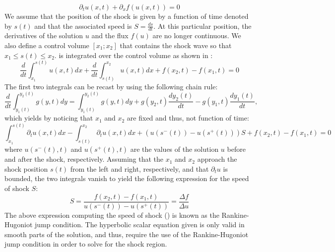 %
\begin{equation}\label{eq:rh_sct1b}
\partial_t u(x,t) + \partial_x f(u(x,t)) = 0
\end{equation}
%
We assume that the position of the shock is given by a function of time denoted by $s(t)$ and that the associated speed is $S = \frac{ds}{dt}$. At this particular position, the derivatives of the solution $u$ and the flux $f(u)$ are no longer continuous. We also define a control volume $\left[ x_1; x_2 \right]$ that contains the shock wave so that $x_1 \leq s(t) \leq x_2$.  is integrated over the control volume as shown in :
%
\begin{equation}\label{eq:rh2_sct1b}
\frac{d}{dt} \int_{x_1}^{s(t)} u(x,t) dx + \frac{d}{dt} \int_{s(t)}^{x_2} u(x,t) dx + f(x_2,t) - f(x_1,t) = 0
\end{equation}
% 
The first two integrals can be recast by using the following chain rule:
%
\begin{equation}\label{eq:rh3_sct1b}
\frac{d}{dt} \int_{y_1(t)}^{y_2(t)} g(y,t) dy =  \int_{y_1(t)}^{y_2(t)} g(y,t) dy + g(y_2,t) \frac{d y_2(t)}{dt} - g(y_1,t) \frac{d y_1(t)}{dt},
\end{equation}
% 
which yields by noticing that $x_1$ and $x_2$ are fixed and thus, not function of time:
%
\begin{equation}\label{eq:rh4_sct1b}
\int_{x_1}^{s(t)} \partial_t u(x,t) dx - \int_{s(t)}^{x_2} \partial_t u(x,t) dx + \left( u(s^-(t)) - u(s^+(t)) \right) S + f(x_2,t) - f(x_1,t) = 0
\end{equation}
%
where $u(s^-(t),t)$ and $u(s^+(t),t)$ are the values of the solution $u$ before and after the shock, respectively. Assuming that the $x_1$ and $x_2$ approach the shock position $s(t)$ from the left and right, respectively, and that $\partial_t u$ is bounded, the two integrals vanish to yield the following expression for the speed of shock $S$:
%
\begin{equation}\label{eq:rh5_sct1b}
S = \frac{f(x_2,t) - f(x_1,t)}{u(s^-(t)) - u(s^+(t))} = \frac{\Delta f}{\Delta u}
\end{equation}
%
The above expression computing the speed of shock () is known as the Rankine-Hugoniot jump condition. The hyperbolic scalar equation given  is only valid in smooth parts of the solution, and thus, require the use of the Rankine-Hugoniot jump condition in order to solve for the shock region.   
